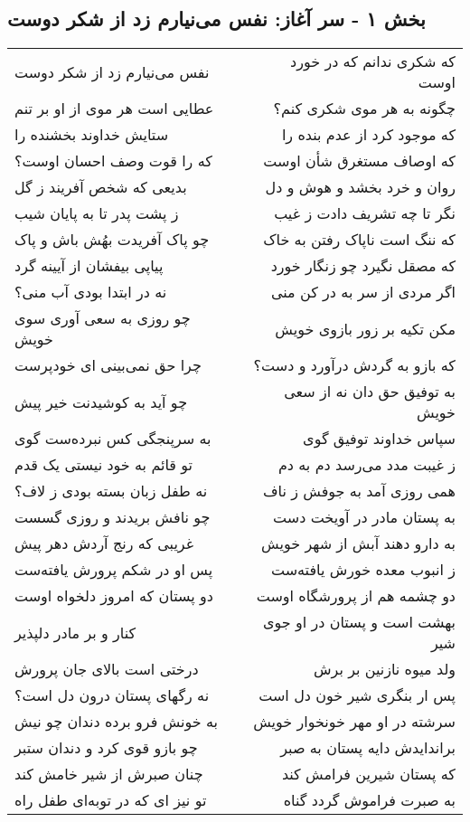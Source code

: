 \begin{center}
\section*{بخش ۱ - سر آغاز: نفس می‌نیارم زد از شکر دوست}
\label{sec:001}
\begin{longtable}{l p{0.5cm} r}
نفس می‌نیارم زد از شکر دوست
&&
که شکری ندانم که در خورد اوست
\\
عطایی است هر موی از او بر تنم
&&
چگونه به هر موی شکری کنم؟
\\
ستایش خداوند بخشنده را
&&
که موجود کرد از عدم بنده را
\\
که را قوت وصف احسان اوست؟
&&
که اوصاف مستغرق شأن اوست
\\
بدیعی که شخص آفریند ز گل
&&
روان و خرد بخشد و هوش و دل
\\
ز پشت پدر تا به پایان شیب
&&
نگر تا چه تشریف دادت ز غیب
\\
چو پاک آفریدت بهُش باش و پاک
&&
که ننگ است ناپاک رفتن به خاک
\\
پیاپی بیفشان از آیینه گرد
&&
که مصقل نگیرد چو زنگار خورد
\\
نه در ابتدا بودی آب منی؟
&&
اگر مردی از سر به در کن منی
\\
چو روزی به سعی آوری سوی خویش
&&
مکن تکیه بر زور بازوی خویش
\\
چرا حق نمی‌بینی ای خودپرست
&&
که بازو به گردش درآورد و دست؟
\\
چو آید به کوشیدنت خیر پیش
&&
به توفیق حق دان نه از سعی خویش
\\
به سرپنجگی کس نبرده‌ست گوی
&&
سپاس خداوند توفیق گوی
\\
تو قائم به خود نیستی یک قدم
&&
ز غیبت مدد می‌رسد دم به دم
\\
نه طفل زبان بسته بودی ز لاف؟
&&
همی روزی آمد به جوفش ز ناف
\\
چو نافش بریدند و روزی گسست
&&
به پستان مادر در آویخت دست
\\
غریبی که رنج آردش دهر پیش
&&
به دارو دهند آبش از شهر خویش
\\
پس او در شکم پرورش یافته‌ست
&&
ز انبوب معده خورش یافته‌ست
\\
دو پستان که امروز دلخواه اوست
&&
دو چشمه هم از پرورشگاه اوست
\\
کنار و بر مادر دلپذیر
&&
بهشت است و پستان در او جوی شیر
\\
درختی است بالای جان پرورش
&&
ولد میوه نازنین بر برش
\\
نه رگهای پستان درون دل است؟
&&
پس ار بنگری شیر خون دل است
\\
به خونش فرو برده دندان چو نیش
&&
سرشته در او مهر خونخوار خویش
\\
چو بازو قوی کرد و دندان ستبر
&&
براندایدش دایه پستان به صبر
\\
چنان صبرش از شیر خامش کند
&&
که پستان شیرین فرامش کند
\\
تو نیز ای که در توبه‌ای طفل راه
&&
به صبرت فراموش گردد گناه
\\
\end{longtable}
\end{center}
